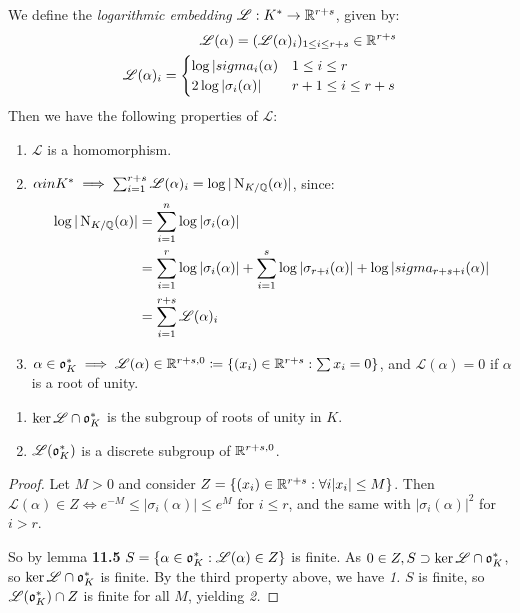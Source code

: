 \documentclass[10pt,a4paper]{article}
\begin{document}
We define the \emph{logarithmic embedding} $\mathscr{L}:K^{\ast} \to \mathbb{R}^{r+s}$, given by:
\begin{align*}
\mathscr{L}(\alpha) = (\mathscr{L}(\alpha)_i)_{1\leq i\leq r+s} \in \mathbb{R}^{r+s}\\
\mathscr{L}(\alpha)_i = \begin{cases} \log|sigma_i(\alpha) & 1 \leq i \leq r \\ 2\log|\sigma_i(\alpha)| & r+1 \leq i \leq r+s\end{cases}
\end{align*}
Then we have the following properties of $\mathscr{L}$:
\begin{enumerate}
\item $\mathscr{L}$ is a homomorphism.
\item $\alpha in K^{\ast} \implies \sum_{i=1}^{r+s} \mathscr{L}(\alpha)_i = \log |\operatorname{N}_{K/\mathbb{Q}}(\alpha)|$, since:
\begin{align*}
\log |\operatorname{N}_{K/\mathbb{Q}}(\alpha)| &= \sum_{i=1}^n \log |\sigma_i(\alpha)|\\
&= \sum_{i=1}^r \log |\sigma_i(\alpha)| + \sum_{i=1}^s \log |\sigma_{r+i}(\alpha)| + \log |sigma_{r+s+i}(\alpha)|\\
&= \sum_{i=1}^{r+s} \mathscr{L}(\alpha)_i
\end{align*}
\item $\alpha \in \mathfrak{o}_K^\ast \implies \mathscr{L}(\alpha) \in \mathbb{R}^{r+s,0}\coloneqq \{(x_i) \in \mathbb{R}^{r+s} : \sum x_i = 0\}$, and $\mathscr{L}(\alpha) = 0$ if $\alpha$ is a root of unity.
\end{enumerate}
\begin{proposition}
\item
\begin{enumerate}
\item $\ker \mathscr{L} \cap \mathfrak{o}_K^\ast$ is the subgroup of roots of unity in $K$.
\item $\mathscr{L}(\mathfrak{o}_K^\ast)$ is a discrete subgroup of $\mathbb{R}^{r+s,0}$.
\end{enumerate}
\end{proposition}
\begin{proof}
Let $M >0$ and consider $Z = \{(x_i) \in \mathbb{R}^{r+s} : \forall i |x_i|\leq M\}$. Then $\mathscr{L}(\alpha) \in Z \iff e^{-M} \leq |\sigma_i(\alpha)|\leq e^M$ for $i \leq r$, and the same with $|\sigma_i(\alpha)|^2$ for $i >r$.

So by lemma \textbf{11.5} $S = \{\alpha \in \mathfrak{o}_K^\ast : \mathscr{L}(\alpha) \in Z\}$ is finite. As $0 \in Z, S \supset \ker \mathscr{L} \cap \mathfrak{o}_K^\ast$, so $\ker \mathscr{L} \cap \mathfrak{o}_K^\ast$ is finite. By the third property above, we have \textit{1.} $S$ is finite, so $\mathscr{L}(\mathfrak{o}_K^\ast)\cap Z$ is finite for all $M$, yielding \textit{2.}
\end{proof}
\end{document}
